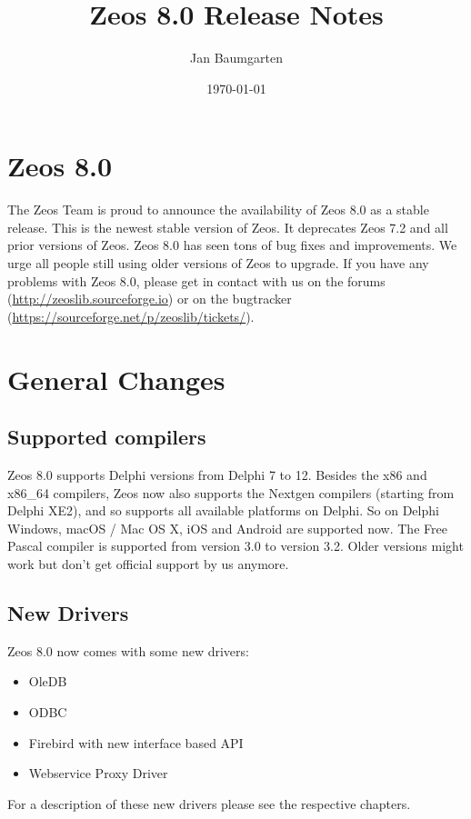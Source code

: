 \documentclass[a4paper,12pt,oneside]{article}
\title{Zeos 8.0 Release Notes}
\author{Jan Baumgarten}
\date{\today}
\begin{document}
\lstset{%
  language=Pascal,
  basicstyle=\small, %
  showstringspaces=false} %

\maketitle

\section{Zeos 8.0}
The Zeos Team is proud to announce the availability of Zeos 8.0 as a stable release.
This is the newest stable version of Zeos.
It deprecates Zeos 7.2 and all prior versions of Zeos.
Zeos 8.0 has seen tons of bug fixes and improvements.
We urge all people still using older versions of Zeos to upgrade.
If you have any problems with Zeos 8.0, please get in contact with us on the forums (\url{http://zeoslib.sourceforge.io}) or on the bugtracker (\url{https://sourceforge.net/p/zeoslib/tickets/}).

\section{General Changes}
\label{sec:GeneralChanges}
\subsection{Supported compilers}
\label{sec:GeneralChanges_SupportedCompilers}
Zeos 8.0 supports Delphi versions from Delphi 7 to 12.
Besides the x86 and x86\_64 compilers, Zeos now also supports the Nextgen compilers (starting from Delphi XE2), and so supports all available platforms on Delphi.
So on Delphi Windows, macOS / Mac OS X, iOS and Android are supported now.
The Free Pascal compiler is supported from version 3.0 to version 3.2.
Older versions might work but don't get official support by us anymore.

\subsection{New Drivers}
\label{sec:GeneralChanges_NewDrivers}
Zeos 8.0 now comes with some new drivers:
\begin{itemize}
  \item OleDB
	\item ODBC
	\item Firebird with new interface based API
	\item Webservice Proxy Driver
\end{itemize}
For a description of these new drivers please see the respective chapters.
\end{document}
